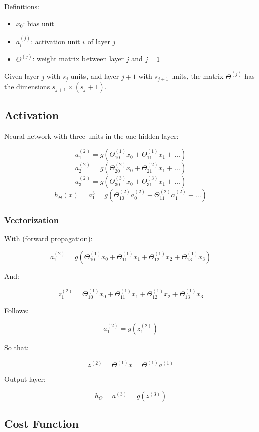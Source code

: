 \documentclass[a4paper,11pt]{scrartcl}
\begin{document}
Definitions:

\begin{itemize}
    \item $x_0$: bias unit
    \item $a_i^{(j)}$: activation unit $i$ of layer $j$
    \item $\Theta^{(j)}$: weight matrix between layer $j$ and $j+1$
\end{itemize}

Given layer $j$ with $s_j$ units, and layer $j+1$ with $s_{j+1}$ units, the matrix $\Theta^{(j)}$ has the dimensions $s_{j+1}\times(s_{j}+1)$.

\subsection{Activation}

Neural network with three units in the one hidden layer:

$$ a_1^{(2)} = g(\Theta^{(1)}_{10}x_0 + \Theta^{(1)}_{11}x_1 + \dots) $$
$$ a_2^{(2)} = g(\Theta^{(2)}_{20}x_0 + \Theta^{(2)}_{21}x_1 + \dots) $$
$$ a_3^{(2)} = g(\Theta^{(3)}_{30}x_0 + \Theta^{(3)}_{31}x_1 + \dots) $$
$$ h_{\Theta}(x) = a_1^3 = g(\Theta^{(2)}_{10}a^{(2)}_0 + \Theta^{(2)}_{11}a^{(2)}_1 + \dots)$$

\subsubsection{Vectorization}

With (forward propagation):

$$ a^{(2)}_1 = g(\Theta^{(1)}_{10}x_0 + \Theta^{(1)}_{11}x_1 + \Theta^{(1)}_{12}x_2 + \Theta^{(1)}_{13}x_3) $$

And:

$$ z^{(2)}_1 = \Theta^{(1)}_{10}x_0 + \Theta^{(1)}_{11}x_1 + \Theta^{(1)}_{12}x_2 + \Theta^{(1)}_{13}x_3 $$

Follows:

$$ a^{(2)}_1 = g(z^{(2)}_1) $$

So that:

$$ z^{(2)} = \Theta^{(1)} x = \Theta^{(1)} a^{(1)} $$

Output layer:

$$ h_{\Theta} = a^{(3)} = g(z^{(3)}) $$

\subsection{Cost Function}
\end{document}
